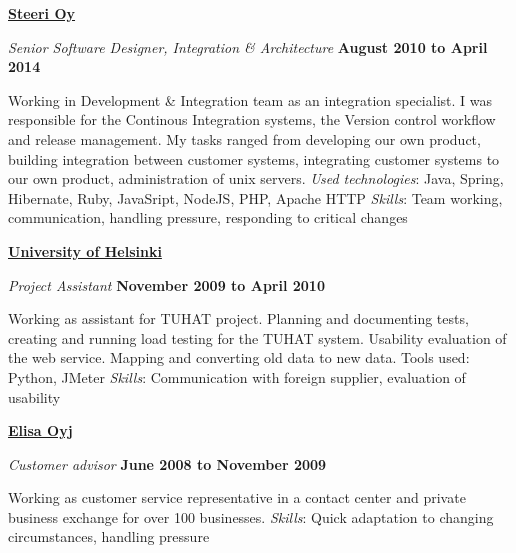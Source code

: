 \documentclass[10pt,english,a4paper]{article}
\newenvironment{outerlist}[1][\enskip\textbullet]%
        {\begin{itemize}[#1]}{\end{itemize}%
         \vspace{-.6\baselineskip}}
\newenvironment{innerlist}[1][\enskip\textbullet]%
        {\begin{compactitem}[#1]}{\end{compactitem}}
\newcommand{\blankline}{\quad\pagebreak[2]}
\begin{document}
\href{http://steeri.fi/}{\textbf{Steeri Oy}}
\begin{outerlist}

\item[] \textit{Senior Software Designer, Integration \& Architecture}%
    \hfill \textbf{August 2010 to April 2014}
    \begin{innerlist}
		\item Working in Development \& Integration team as an integration specialist.
        I was responsible for the Continous Integration systems, the Version control workflow and release management.
         My tasks ranged from developing our own product, building integration between customer systems,
         integrating customer systems to our own product, administration of unix servers.
         \emph{Used technologies}: Java, Spring, Hibernate, Ruby, JavaSript, NodeJS, PHP, Apache HTTP
         \emph{Skills}: Team working, communication, handling pressure, responding to critical changes
    \end{innerlist}
\end{outerlist}
\blankline

\href{http://www.helsinki.fi/university/index.html}{\textbf{University of Helsinki}}
\begin{outerlist}

\item[] \textit{Project Assistant}%
    \hfill \textbf{November 2009 to April 2010}
    \begin{innerlist}
        \item Working as assistant for TUHAT project. Planning and documenting tests,
        creating and running load testing for the TUHAT system. Usability evaluation of the web service.
        Mapping and converting old data to new data.
        Tools used: Python, JMeter
        \emph{Skills}: Communication with foreign supplier, evaluation of usability
    \end{innerlist}
\end{outerlist}
\blankline


\href{http://corporate.elisa.fi/elisa-oyj/}{\textbf{Elisa Oyj}}
\begin{outerlist}

\item[] \textit{Customer advisor}%
    \hfill \textbf{June 2008 to November 2009}
    \begin{innerlist}
        \item Working as customer service representative in a contact center and private business exchange for over 100 businesses.
        \emph{Skills}: Quick adaptation to changing circumstances, handling pressure
    \end{innerlist}

\end{outerlist}
\blankline
\end{document}
